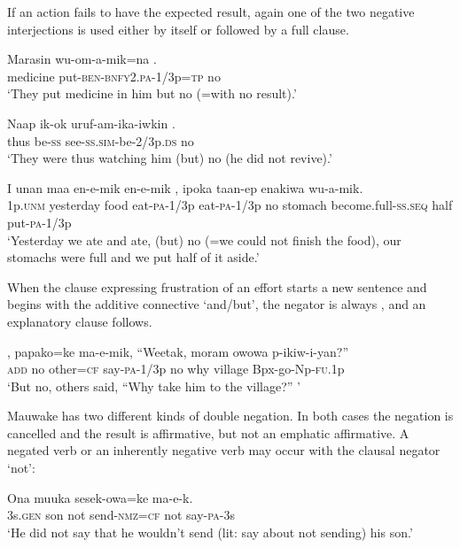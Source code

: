 If an action fails to have the expected result, again one of the two negative interjections is used either by itself or followed by a full clause. 

\ea%
\label{ex:6:x1124}
\gll Marasin  wu-om-a-mik=na  . \\
medicine  put-\textsc{ben}-\textsc{bnfy}2.\textsc{pa}-1/3p=\textsc{tp}  no\\
\glt `They put medicine in him but no (=with no result).'
\z

\ea%
\label{ex:6:x1126}
\gll Naap  ik-ok  uruf-am-ika-iwkin  . \\
thus  be-\textsc{ss}  see-\textsc{ss}.\textsc{sim}-be-2/3p.\textsc{ds}  no\\
\glt `They were thus watching him (but) no (he did not revive).'
\z

\ea%
\label{ex:6:x1123}
\gll I  unan  maa  en-e-mik  en-e-mik  , ipoka  taan-ep  enakiwa  wu-a-mik. \\
1p.\textsc{unm}  yesterday  food  eat-\textsc{pa}-1/3p  eat-\textsc{pa}-1/3p  no stomach  become.full-\textsc{ss}.\textsc{seq}  half  put-\textsc{pa}-1/3p\\
\glt `Yesterday we ate and ate, (but) no (=we could not finish the food), our stomachs were full and we put half of it aside.'
\z

When the clause expressing frustration of an effort starts a new sentence and begins with the additive connective  `and/but', the negator is always , and an explanatory clause follows.

\ea%
\label{ex:6:x1125}
\gll {}  ,  papako=ke  ma-e-mik,  ``Weetak,  moram owowa  p-ikiw-i-yan?'' \\
\textsc{add}  no  other=\textsc{cf}  say-\textsc{pa}-1/3p  no  why village  Bpx-go-Np-\textsc{fu}.1p\\
\glt `But no, others said, ``Why take him to the village?'' '
\z

Mauwake has two different kinds of double negation. In both cases the negation is cancelled and the result is affirmative, but not an emphatic affirmative. A negated verb or an inherently negative verb may occur with the clausal negator  `not':

\ea%
\label{ex:6:x1131}
\gll Ona  muuka    sesek-owa=ke    ma-e-k. \\
3s.\textsc{gen}  son  not  send-\textsc{nmz}=\textsc{cf}  not  say-\textsc{pa}-3s\\
\glt `He did not say that he wouldn't send (lit: say about not sending) his son.'
\z

